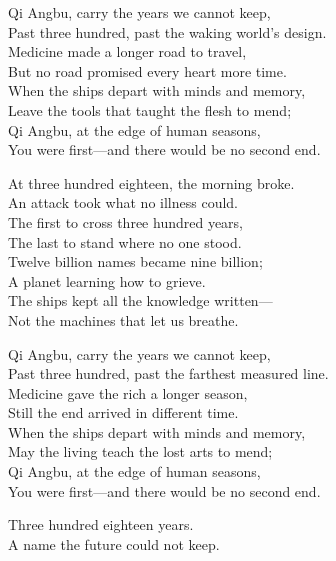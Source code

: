 \begin{lyrics}
Qi Angbu, carry the years we cannot keep,\\
Past three hundred, past the waking world’s design.\\
Medicine made a longer road to travel,\\
But no road promised every heart more time.\\
When the ships depart with minds and memory,\\
Leave the tools that taught the flesh to mend;\\
Qi Angbu, at the edge of human seasons,\\
You were first—and there would be no second end.

At three hundred eighteen, the morning broke.\\
An attack took what no illness could.\\
The first to cross three hundred years,\\
The last to stand where no one stood.\\
Twelve billion names became nine billion;\\
A planet learning how to grieve.\\
The ships kept all the knowledge written—\\
Not the machines that let us breathe.

Qi Angbu, carry the years we cannot keep,\\
Past three hundred, past the farthest measured line.\\
Medicine gave the rich a longer season,\\
Still the end arrived in different time.\\
When the ships depart with minds and memory,\\
May the living teach the lost arts to mend;\\
Qi Angbu, at the edge of human seasons,\\
You were first—and there would be no second end.

Three hundred eighteen years.\\
A name the future could not keep.
\end{lyrics}

